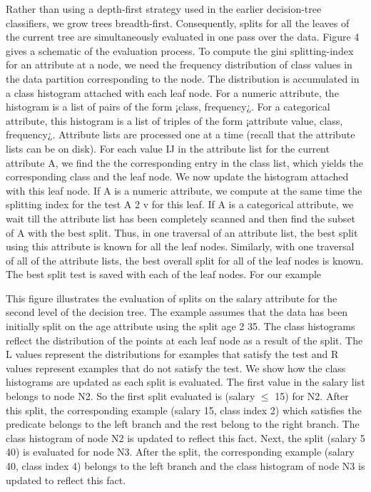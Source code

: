 \documentclass[12pt]{article}
\renewcommand{\_}{\kern-1.5pt\textunderscore\kern-1.5pt}
\begin{document}
\begin{enumerate}
Rather than using a depth-first strategy used in the earlier decision-tree classifiers, we grow trees breadth-first. Consequently, splits for all the leaves of the current tree are simultaneously evaluated in one pass over the data. Figure 4 gives a schematic of the evaluation process. To compute the gini splitting-index for an attribute at a node, we need the frequency distribution of class values in the data partition corresponding to the node. The distribution is accumulated in a class histogram attached with each leaf node. For a numeric attribute, the histogram is a list of pairs of the form ¡class, frequency¿. For a categorical attribute, this histogram is a list of triples of the form ¡attribute value, class, frequency¿. Attribute lists are processed one at a time (recall that the attribute lists can be on disk). For each value IJ in the attribute list for the current attribute A, we find the the corresponding entry in the class list, which yields the corresponding class and the leaf node. We now update the histogram attached with this leaf node. If A is a numeric attribute, we compute at the same time the splitting index for the test A 2 v for this leaf. If A is a categorical attribute, we wait till the attribute list has been completely scanned and then find the subset of A with the best split. Thus, in one traversal of an attribute list, the best split using this attribute is known for all the leaf nodes. Similarly, with one traversal of all of the attribute lists, the best overall split for all of the leaf nodes is known. The best split test is saved with each of the leaf nodes. For our example\par

\par

This figure illustrates the evaluation of splits on the salary attribute for the second level of the decision tree. The example assumes that the data has been initially split on the age attribute using the split age 2 35. The class histograms reflect the distribution of the points at each leaf node as a result of the split. The L values represent the distributions for examples that satisfy the test and R values represent examples that do not satisfy the test. We show how the class histograms are updated as each split is evaluated. The first value in the salary list belongs to node N2. So the first split evaluated is (salary $ \leq $  15) for N2. After this split, the corresponding example (salary 15, class index 2) which satisfies the predicate belongs to the left branch and the rest belong to the right branch. The class histogram of node N2 is updated to reflect this fact. Next, the split (salary 5 40) is evaluated for node N3. After the split, the corresponding example (salary 40, class index 4) belongs to the left branch and the class histogram of node N3 is updated to reflect this fact.\par


\end{enumerate}
\end{document}

